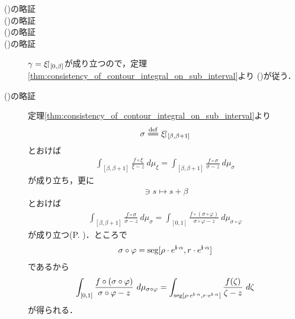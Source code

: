 	\begin{description}
		\item[()の略証]
		\item[()の略証]
		\item[()の略証]
		\item[()の略証]
			$\gamma = \xi \hspace{-0.41em}\upharpoonright_{[0,\beta]}$が成り立つので，定理\ref{thm:consistency_of_contour_integral_on_sub_interval}より
			()が従う．
			
		\item[()の略証]
			定理\ref{thm:consistency_of_contour_integral_on_sub_interval}より
			\begin{align}
				\sigma \defeq \xi \rest_{[\beta,\beta+1]}
			\end{align}
			とおけば
			\begin{align}
				\int_{[\beta,\beta+1]} \frac{f \circ \xi}{\xi - z}\ d\mu_{\xi}
				= \int_{[\beta,\beta+1]} \frac{f \circ \sigma}{\sigma - z}\ d\mu_{\sigma}
			\end{align}
			が成り立ち，更に
			\begin{align}
				[0,1] \ni s \longmapsto s + \beta
			\end{align}
			とおけば
			\begin{align}
				\int_{[\beta,\beta+1]} \frac{f \circ \sigma}{\sigma - z}\ d\mu_{\sigma}
				= \int_{[0,1]} \frac{f \circ (\sigma \circ \varphi)}{\sigma \circ \varphi - z}\ d\mu_{\sigma \circ \varphi}
			\end{align}
			が成り立つ(P. \pageref{fom:change_of_parameter_interval_complex_contour_integral})．ところで
			\begin{align}
				\sigma \circ \varphi = \operatorname{seg}[\rho \cdot e^{\mathbf{i} \cdot \alpha},r \cdot e^{\mathbf{i} \cdot \alpha}]
			\end{align}
			であるから
			\begin{align}
				\int_{[0,1]} \frac{f \circ (\sigma \circ \varphi)}{\sigma \circ \varphi - z}\ d\mu_{\sigma \circ \varphi}
				= \int_{\operatorname{seg}[\rho \cdot e^{\mathbf{i} \cdot \alpha},r \cdot e^{\mathbf{i} \cdot \alpha}]} \frac{f(\zeta)}{\zeta - z}\ d\zeta
			\end{align}
			が得られる．
		

\end{description}
